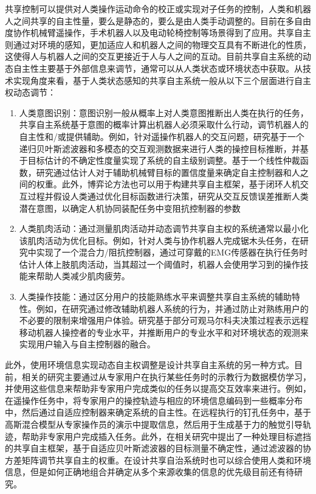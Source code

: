 共享控制可以提供对人类操作运动命令的校正或实现对子任务的控制，人类和机器人之间共享的自主性量，要么是静态的，要么是由人类手动调整的。目前在多自由度协作机械臂遥操作\cite{kronhardtUnderstandingSharedControl2023}，手术机器人\cite{zhangHumanRobotSharedControl2022}以及电动轮椅控制\cite{qinanliDynamicSharedControl2011}等场景得到了应用。共享自主则通过对环境的感知，更加适应人和机器人之间的物理交互具有不断进化的性质，这使得人与机器人之间的交互更接近于人与人之间的互动。目前共享自主系统的动态自主性主要基于外部信息来调节，通常可以从人类状态或环境状态中获取。从技术实现角度来看，基于人类状态感知的共享自主系统一般从以下三个层面进行自主权动态调节：
\begin{enumerate}
\item 人类意图识别：意图识别一般从概率上对人类意图推断出人类在执行的任务，共享自主系统基于意图的概率计算出机器人必须采取什么行动，调节机器人的自主性和/或提供辅助。例如，针对遥操作机器人的交互问题，研究\cite{jainProbabilisticHumanIntent2020}基于一个递归贝叶斯滤波器和多模态的交互观测数据来进行人类的操控目标推断，并基于目标估计的不确定性度量实现了系统的自主级别调整。基于一个线性仲裁函数，研究\cite{gopinathHumanintheLoopOptimizationShared2017}通过估计人对于辅助机械臂目标的置信度量来确定自主控制器和人之间的权重。此外，博弈论方法也可以用于构建共享自主框架，基于闭环人机交互过程并假设人类通过优化目标函数进行决策，研究\cite{liFrameworkHumanRobot2016,liContinuousRoleAdaptation2015}从交互反馈误差推断人类潜在意图，以确定人机协同装配任务中变阻抗控制器的参数
\item 人类肌肉活动：通过测量肌肉活动并动态调节共享自主权的系统通常以最小化该肌肉活动为优化目标。例如，针对人类与协作机器人完成锯木头任务，在研究\cite{peternelAdaptationRobotPhysical2016}中实现了一个混合力/阻抗控制器，通过可穿戴的EMG传感器在执行任务时估计人体上肢肌肉活动，当其超过一个阈值时，机器人会使用学习到的操作技能来帮助人类减少肌肉疲劳。
\item 人类操作技能：通过区分用户的技能熟练水平来调整共享自主系统的辅助特性。例如，在研究\cite{enayatiSkillbasedHumanRobot2018}通过修改辅助机器人系统的行为，并通过防止对熟练用户的不必要的限制来增强用户体验。研究\cite{millikenModelingUserExpertise2017}基于部分可观马尔科夫决策过程表示远程移动机器人操控者的专业水平，并推断用户的专业水平和对环境状态的观测来实现用户输入与自主控制器的融合。
\end{enumerate}

此外，使用环境信息实现动态自主权调整是设计共享自主系统的另一种方式。目前，相关的研究主要通过从专家用户在执行某些任务时的示教行为数据模仿学习，并使用这些信息来帮助非专家用户完成类似的任务以提高交互效率来进行。例如，在遥操作任务中，将专家用户的操控轨迹与相应的环境信息编码到一些概率分布中，然后通过自适应控制器来确定系统的自主性\cite{abi-farrajLearningbasedSharedControl2017}。在远程执行的钉孔任务中，基于高斯混合模型从专家操作员的演示中提取信息，然后用于生成基于力的触觉引导轨迹，帮助非专家用户完成插入任务\cite{perez-del-pulgarUsingLearningDemonstration2016}。此外，在相关研究\cite{balachandranAdaptiveAuthorityAllocation2020a}中提出了一种处理目标遮挡的共享自主框架，基于自适应贝叶斯滤波器的目标测量不确定性，通过滤波器的协方差矩阵调节共享自主的权重。在设计共享自治系统时也可以综合使用人类和环境信息，但是如何正确地组合并确定从多个来源收集的信息的优先级目前还有待研究。

